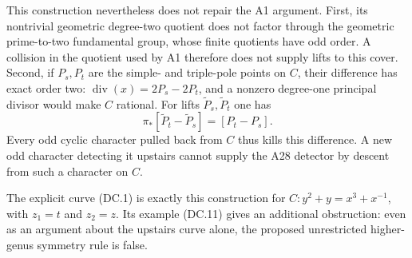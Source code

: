 This construction nevertheless does not repair the A1
argument.  First, its nontrivial geometric degree-two
quotient does not factor through the geometric
prime-to-two fundamental group, whose finite quotients
have odd order.  A collision in the quotient used by A1
therefore does not supply lifts to this cover.
Second, if $P_s,P_t$ are the simple- and triple-pole
points on $C$, their difference has exact order two:
$\operatorname{div}(x)=2P_s-2P_t$, and a nonzero
degree-one principal divisor would make $C$ rational.
For lifts $\widetilde P_s,\widetilde P_t$ one has
\[
 \pi_*[\widetilde P_t-\widetilde P_s]=[P_t-P_s].
\tag{DC.13}
\]
Every odd cyclic character pulled back from $C$ thus
kills this difference.  A new odd character detecting
it upstairs cannot supply the A28 detector by descent
from such a character on $C$.

The explicit curve (DC.1) is exactly this construction
for $C:y^2+y=x^3+x^{-1}$, with $z_1=t$ and $z_2=z$.
Its example (DC.11) gives an additional obstruction:
even as an argument about the upstairs curve alone,
the proposed unrestricted higher-genus symmetry rule
is false.
